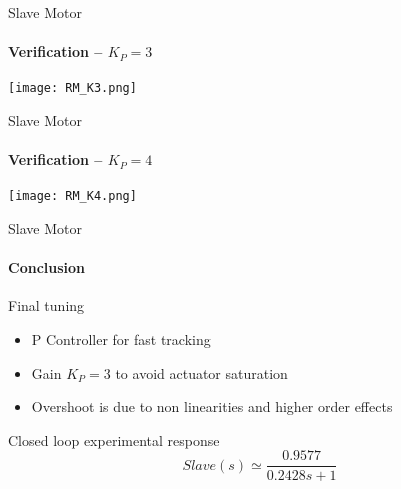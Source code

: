 \begin{frame}{Slave Motor}
\framesubtitle{Verification -- $K_P = 3$}
\centering
\texttt{[image: RM\_K3.png]}
\end{frame}


\begin{frame}{Slave Motor}
\framesubtitle{Verification -- $K_P = 4$}
\centering
\texttt{[image: RM\_K4.png]}
	\end{frame}

\begin{frame}{Slave Motor}
\framesubtitle{Conclusion}
\begin{block}{Final tuning}
\begin{itemize}
\item P Controller for fast tracking
\item Gain $K_P = 3$ to avoid actuator saturation
\item Overshoot is due to non linearities and higher order effects
\end{itemize}
\end{block}
\begin{block}{Closed loop experimental response}
\[Slave(s) \simeq \frac{0.9577}{0.2428s + 1}\]
\end{block}
\end{frame}
